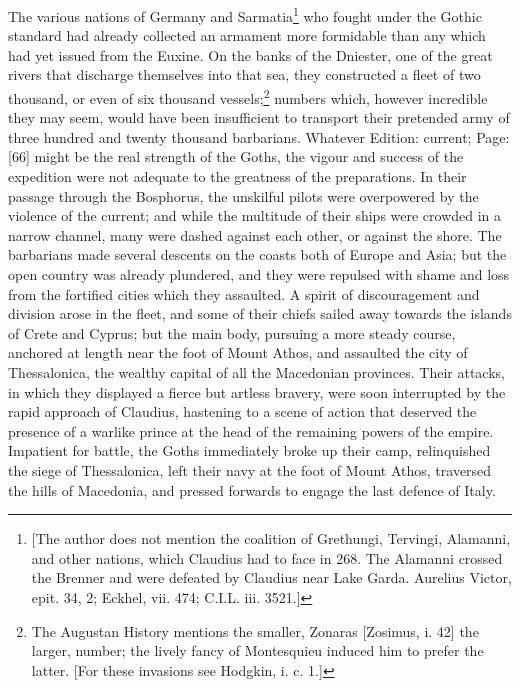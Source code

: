 The various nations of Germany and Sarmatia\footnote{[The author does not mention the coalition of Grethungi, Tervingi, Alamanni, and other nations, which Claudius had to face in 268. The Alamanni crossed the Brenner and were defeated by Claudius near Lake Garda. Aurelius Victor, epit. 34, 2; Eckhel, vii. 474; C.I.L. iii. 3521.]} who fought under the Gothic standard had already collected an armament more formidable than any which had yet issued from the Euxine. On the banks of the Dniester, one of the great rivers that discharge themselves into that sea, they constructed a fleet of two thousand, or even of six thousand vessels;\footnote{The Augustan History mentions the smaller, Zonaras [Zosimus, i. 42] the larger, number; the lively fancy of Montesquieu induced him to prefer the latter. [For these invasions see Hodgkin, i. c. 1.]} numbers which, however incredible they may seem, would have been insufficient to transport their pretended army of three hundred and twenty thousand barbarians. Whatever Edition: current; Page: [66] might be the real strength of the Goths, the vigour and success of the expedition were not adequate to the greatness of the preparations. In their passage through the Bosphorus, the unskilful pilots were overpowered by the violence of the current; and while the multitude of their ships were crowded in a narrow channel, many were dashed against each other, or against the shore. The barbarians made several descents on the coasts both of Europe and Asia; but the open country was already plundered, and they were repulsed with shame and loss from the fortified cities which they assaulted. A spirit of discouragement and division arose in the fleet, and some of their chiefs sailed away towards the islands of Crete and Cyprus; but the main body, pursuing a more steady course, anchored at length near the foot of Mount Athos, and assaulted the city of Thessalonica, the wealthy capital of all the Macedonian provinces. Their attacks, in which they displayed a fierce but artless bravery, were soon interrupted by the rapid approach of Claudius, hastening to a scene of action that deserved the presence of a warlike prince at the head of the remaining powers of the empire. Impatient for battle, the Goths immediately broke up their camp, relinquished the siege of Thessalonica, left their navy at the foot of Mount Athos, traversed the hills of Macedonia, and pressed forwards to engage the last defence of Italy.

